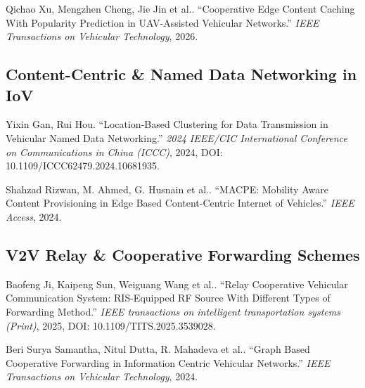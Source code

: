 \documentclass{article}
\begin{document}
Qichao Xu, Mengzhen Cheng, Jie Jin et al.. ``Cooperative Edge Content Caching With Popularity Prediction in UAV-Assisted Vehicular Networks.'' 
\textit{IEEE Transactions on Vehicular Technology}, 2026.



\subsection*{Content-Centric \& Named Data Networking in IoV}

Yixin Gan, Rui Hou. ``Location-Based Clustering for Data Transmission in Vehicular Named Data Networking.'' 
\textit{2024 IEEE/CIC International Conference on Communications in China (ICCC)}, 2024, DOI: 10.1109/ICCC62479.2024.10681935.

Shahzad Rizwan, M. Ahmed, G. Husnain et al.. ``MACPE: Mobility Aware Content Provisioning in Edge Based Content-Centric Internet of Vehicles.'' 
\textit{IEEE Access}, 2024.



\subsection*{V2V Relay \& Cooperative Forwarding Schemes}

Baofeng Ji, Kaipeng Sun, Weiguang Wang et al.. ``Relay Cooperative Vehicular Communication System: RIS-Equipped RF Source With Different Types of Forwarding Method.'' 
\textit{IEEE transactions on intelligent transportation systems (Print)}, 2025, DOI: 10.1109/TITS.2025.3539028.

Beri Surya Samantha, Nitul Dutta, R. Mahadeva et al.. ``Graph Based Cooperative Forwarding in Information Centric Vehicular Networks.'' 
\textit{IEEE Transactions on Vehicular Technology}, 2024.


\end{document}
